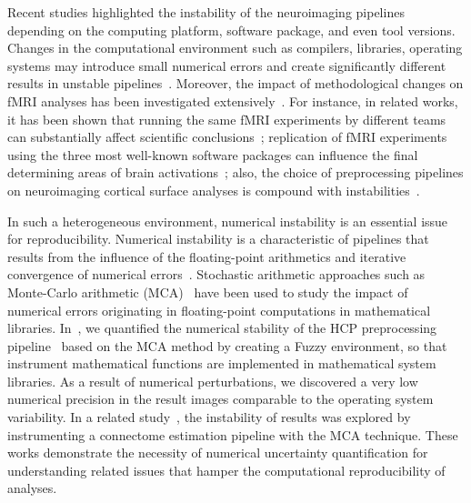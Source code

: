 Recent studies highlighted the instability of the neuroimaging pipelines depending on the computing platform,
software package, and even tool versions. Changes in the computational
environment such as compilers, libraries, operating systems may introduce small numerical errors and create
significantly different results in unstable pipelines~\cite{Glatard2015,Gronenschild2012,salari2020spot}.
Moreover, the impact of methodological changes on fMRI analyses has been investigated extensively~\cite{bowring2019exploring,botvinik2020variability,bhagwat2021understanding,carp2012plurality}.
For instance, in related works, it has been shown that running the same fMRI experiments by different teams can substantially affect
scientific conclusions~\cite{botvinik2020variability,carp2012plurality};
replication of fMRI experiments using the three most well-known software packages can influence the final determining areas of
brain activations~\cite{bowring2019exploring}; %
also, the choice of preprocessing pipelines on neuroimaging cortical surface analyses is compound with instabilities~\cite{bhagwat2021understanding}.

In such a heterogeneous environment, numerical instability is an essential issue for reproducibility.
Numerical instability is a characteristic of pipelines that results from the influence of the floating-point arithmetics
and iterative convergence of numerical errors~\cite{freitas2002issue}.
Stochastic arithmetic approaches such as Monte-Carlo arithmetic (MCA)~\cite{Parker1997-qq} have been used to study the impact of numerical errors
originating in floating-point computations in mathematical libraries.
In~\cite{salari2021accurate}, we quantified the numerical stability of the HCP preprocessing pipeline~\cite{glasser2013} based on the MCA method
by creating a Fuzzy environment, so that instrument mathematical functions are implemented in mathematical system libraries.
As a result of numerical perturbations, we discovered a very low numerical precision in the result images comparable to the operating system variability.
In a related study~\cite{kiar2020numerical}, the instability of results was explored by instrumenting a connectome estimation pipeline with the MCA technique.
These works demonstrate the necessity of numerical uncertainty quantification for understanding related issues that hamper the computational reproducibility of analyses.


